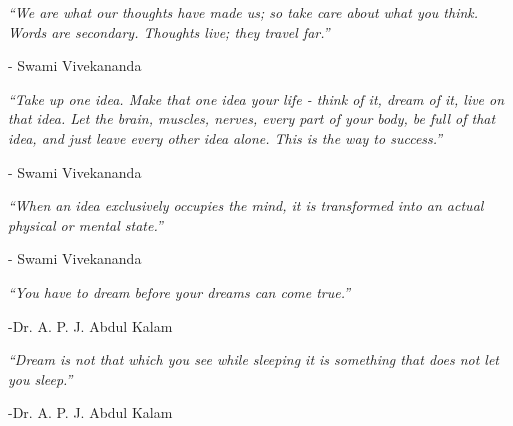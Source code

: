 \documentclass[12pt]{report}
\begin{document}
\newpage
{\it ``We are what our thoughts have made us; so take care about what you think. Words are secondary. Thoughts live; they travel far.''}
\begin{flushright}
- Swami Vivekananda
\end{flushright}


{\it ``Take up one idea. Make that one idea your life - think of it, dream of it, live on that idea. Let the brain, muscles, nerves, every part of your body, be full of that idea, and just leave every other idea alone. This is the way to success.''\\}

\begin{flushright}
- Swami Vivekananda
\end{flushright}

{\it ``When an idea exclusively occupies the mind, it is transformed into an actual physical or mental state.''}
\begin{flushright}
- Swami Vivekananda
\end{flushright}

{\it ``You have to dream before your dreams can come true.''}
\begin{flushright}
-Dr. A. P. J. Abdul Kalam
\end{flushright}


{\it ``Dream is not that which you see while sleeping it is something that does not let you sleep.''}
\begin{flushright}
-Dr. A. P. J. Abdul Kalam
\end{flushright}

\newpage
\end{document}
